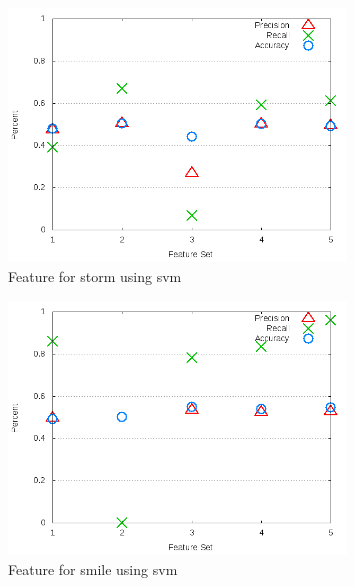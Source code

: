 \clearpage
\begin{figure}[!t]
\centering
\includegraphics[width=0.8\textwidth]{images/svm/test_3/storm_sample_range.png}
\caption{Feature for storm using \gls{svm}}
\label{fig:test_3_storm_svm}
\end{figure}

\begin{figure}[!t]
\centering
\includegraphics[width=0.8\textwidth]{images/svm/test_3/smile_sample_range.png}
\caption{Feature for smile using \gls{svm}}
\label{fig:test_3_smile_svm}
\end{figure}

